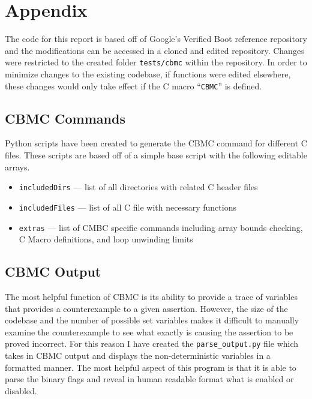 \documentclass[../report.tex]{subfiles}
\def\code#1{\texttt{#1}}
\begin{document}
\onehalfspacing

\section{Appendix}

The code for this report is based off of Google's Verified Boot reference repository\cite{vboot-codebase} and the modifications can be accessed in a cloned and edited repository\cite{my-repo}.
Changes were restricted to the created folder \code{tests/cbmc} within the repository.
In order to minimize changes to the existing codebase, if functions were edited elsewhere, these changes would only take effect if the C macro ``\code{CBMC}'' is defined. 

\subsection{CBMC Commands}

Python scripts have been created to generate the CBMC command for different C files.
These scripts are based off of a simple base script with the following editable arrays.

\begin{itemize}
    \item \code{includedDirs}  --- list of all directories with related C header files 
    \item \code{includedFiles} --- list of all C file with necessary functions
    \item \code{extras} --- list of CMBC specific commands including array bounds checking, C Macro definitions, and loop unwinding limits 
\end{itemize}

\subsection{CBMC Output}

The most helpful function of CBMC is its ability to provide a trace of variables that provides a counterexample to a given assertion. 
However, the size of the codebase and the number of possible set variables makes it difficult to manually examine the counterexample to see what exactly is causing the assertion to be proved incorrect.
For this reason I have created the \code{parse\_output.py} file which takes in CBMC output and displays the non-deterministic variables in a formatted manner. 
The most helpful aspect of this program is that it is able to parse the binary flags and reveal in human readable format what is enabled or disabled.
\end{document}
